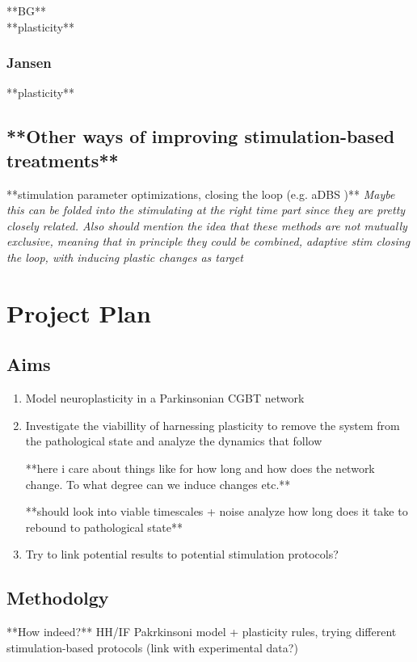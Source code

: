 **BG** \cite{terman2002activity, rubin2004high, rubin2012basal} \\
**plasticity** \cite{madadi2022inhibitory}

\subsubsection{Jansen}
**plasticity** \cite{duchet2023mean} \\
\cite{jansen1995electroencephalogram} \cite{west2022stimulating}


\subsection{**Other ways of improving stimulation-based treatments**}
**stimulation parameter optimizations, closing the loop (e.g. aDBS \cite{beudel2018adaptive})**
\textit{
	Maybe this can be folded into the stimulating at the right time part
	since they are pretty closely related. Also should mention the idea that
	these methods are not mutually exclusive, meaning that in principle they
	could be combined, adaptive stim closing the loop, with inducing plastic
	changes as target
}

\section{Project Plan}


\subsection{Aims}
\begin{enumerate}
	\item Model neuroplasticity in a Parkinsonian CGBT network
	\item Investigate the viabillity of harnessing plasticity to remove the
	      system from the pathological state and analyze the dynamics that follow

	      **here i care about things like for how long and how does the network change.
	      To what degree can we induce changes etc.**

	      **should look into viable timescales + noise analyze how long does it take to rebound to
	      pathological state**
	\item Try to link potential results to potential stimulation protocols?
\end{enumerate}

\subsection{Methodolgy} **How indeed?** HH/IF Pakrkinsoni model + plasticity rules, trying
different stimulation-based protocols (link with experimental data?)

